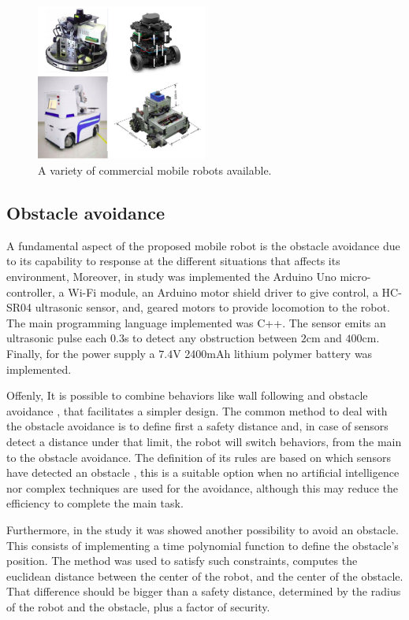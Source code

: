 \begin{figure}[h!]
    \centering
 	\includegraphics[trim=0 0 0 0,clip,width=0.5\textwidth]{Figs/Robot_types.png}
    \caption{A variety of commercial mobile robots available.}
    \label{fig:Aruco_bits}
\end{figure}


\subsection{Obstacle avoidance}

A fundamental aspect of the proposed mobile robot is the obstacle avoidance due to its capability to response at the different situations that affects its environment, Moreover, in \citep{azeta2019obstacle} study was implemented the  Arduino Uno micro-controller, a Wi-Fi module, an Arduino motor shield driver to give control, a HC-SR04 ultrasonic sensor, and, geared motors to provide locomotion to the robot. The main programming language implemented was C++. The sensor emits an ultrasonic pulse each $0.3$s to detect any obstruction between $2$cm  and $400$cm. Finally, for the power supply a $7.4$V 2400mAh lithium polymer battery was implemented.

Offenly, It is possible to combine behaviors like wall following and obstacle avoidance \citep{hacene2019fuzzy}, that facilitates a simpler design. The common method to deal with the obstacle avoidance is to define first a safety distance and, in case of sensors detect a distance under that limit, the robot will switch behaviors, from the main to the obstacle avoidance. The definition of its rules are based on which sensors have detected an obstacle \citep{tzou2009high} \citep{hacene2019fuzzy}, this is a suitable option when no artificial intelligence nor complex techniques are used for the avoidance, although this may reduce the efficiency to complete the main task.

Furthermore, in the \citep{arcos2019optimal} study it was showed another possibility to avoid an obstacle. This consists of implementing a time polynomial function to define the obstacle's position. The method was used to satisfy such constraints, computes the euclidean distance between the center of the robot, and the center of the obstacle. That difference should be bigger than a safety distance, determined by the radius of the robot and the obstacle, plus a factor of security.

